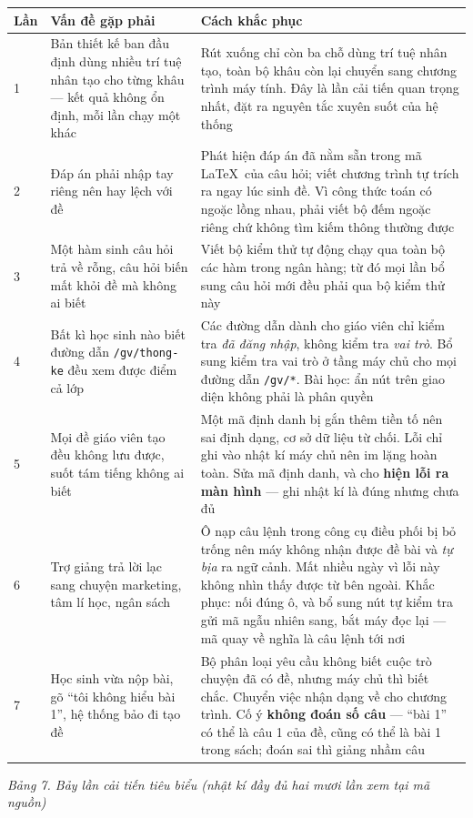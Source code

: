 \begin{center}
\begin{longtable}{|p{1.2cm}|p{5.4cm}|p{6.6cm}|}
\hline
\textbf{Lần} & \textbf{Vấn đề gặp phải} & \textbf{Cách khắc phục} \\ \hline
\endhead
1 & Bản thiết kế ban đầu định dùng nhiều trí tuệ nhân tạo cho từng khâu ---
kết quả không ổn định, mỗi lần chạy một khác &
Rút xuống chỉ còn ba chỗ dùng trí tuệ nhân tạo, toàn bộ khâu còn lại chuyển
sang chương trình máy tính. Đây là lần cải tiến quan trọng nhất, đặt ra nguyên
tắc xuyên suốt của hệ thống \\ \hline

2 & Đáp án phải nhập tay riêng nên hay lệch với đề &
Phát hiện đáp án đã nằm sẵn trong mã \LaTeX\ của câu hỏi; viết chương trình tự
trích ra ngay lúc sinh đề. Vì công thức toán có ngoặc lồng nhau, phải viết bộ
đếm ngoặc riêng chứ không tìm kiếm thông thường được \\ \hline

3 & Một hàm sinh câu hỏi trả về rỗng, câu hỏi biến mất khỏi đề mà không ai biết &
Viết bộ kiểm thử tự động chạy qua toàn bộ các hàm trong ngân hàng; từ đó mọi
lần bổ sung câu hỏi mới đều phải qua bộ kiểm thử này \\ \hline

4 & Bất kì học sinh nào biết đường dẫn \texttt{/gv/thong-ke} đều xem được điểm
cả lớp &
Các đường dẫn dành cho giáo viên chỉ kiểm tra \textit{đã đăng nhập}, không kiểm
tra \textit{vai trò}. Bổ sung kiểm tra vai trò ở tầng máy chủ cho mọi đường dẫn
\texttt{/gv/*}. Bài học: ẩn nút trên giao diện không phải là phân quyền \\ \hline

5 & Mọi đề giáo viên tạo đều không lưu được, suốt tám tiếng không ai biết &
Một mã định danh bị gắn thêm tiền tố nên sai định dạng, cơ sở dữ liệu từ chối.
Lỗi chỉ ghi vào nhật kí máy chủ nên im lặng hoàn toàn. Sửa mã định danh, và cho
\textbf{hiện lỗi ra màn hình} --- ghi nhật kí là đúng nhưng chưa đủ \\ \hline

6 & Trợ giảng trả lời lạc sang chuyện marketing, tâm lí học, ngân sách &
Ô nạp câu lệnh trong công cụ điều phối bị bỏ trống nên máy không nhận được đề
bài và \textit{tự bịa} ra ngữ cảnh. Mất nhiều ngày vì lỗi này không nhìn thấy
được từ bên ngoài. Khắc phục: nối đúng ô, và bổ sung nút tự kiểm tra gửi mã
ngẫu nhiên sang, bắt máy đọc lại --- mã quay về nghĩa là câu lệnh tới nơi \\ \hline

7 & Học sinh vừa nộp bài, gõ ``tôi không hiểu bài 1'', hệ thống bảo đi tạo đề &
Bộ phân loại yêu cầu không biết cuộc trò chuyện đã có đề, nhưng máy chủ thì
biết chắc. Chuyển việc nhận dạng về cho chương trình. Cố ý \textbf{không đoán
số câu} --- ``bài 1'' có thể là câu 1 của đề, cũng có thể là bài 1 trong sách;
đoán sai thì giảng nhầm câu \\ \hline
\end{longtable}
\end{center}
\textit{Bảng 7. Bảy lần cải tiến tiêu biểu (nhật kí đầy đủ hai mươi lần xem tại mã nguồn)}

